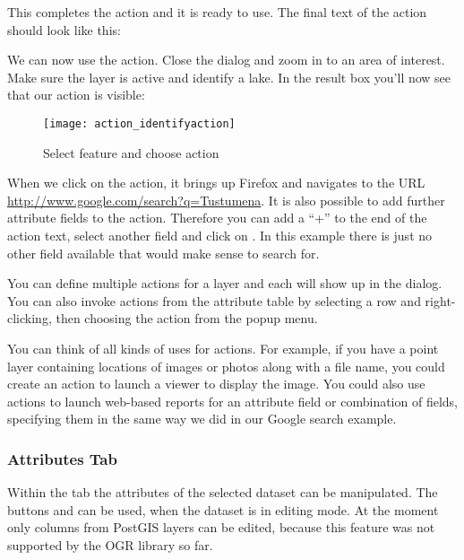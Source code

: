 This completes the action and it is ready to use. The final text of the action
should look like this:

\begin{center}
\end{center}

We can now use the action. Close the  dialog and zoom in to an area
of interest. Make sure the  layer is active and identify a
lake. In the result box you'll now see that our action is visible:

\begin{figure}[H]
   \begin{center}
   \caption{Select feature and choose action \nixcaption}\label{fig:identify_action}\smallskip
   \texttt{[image: action\_identifyaction]} 
\end{center}  
\end{figure}

When we click on the action, it brings up Firefox and navigates to the URL
\url{http://www.google.com/search?q=Tustumena}. It is also possible to add further 
attribute fields to the action. Therefore you can add a ``+'' to the end of the action 
text, select another field and click on . In this example there 
is just no other field available that would make sense to search for.

You can define multiple actions for a layer and each will show up in the
 dialog. You can also invoke actions from the attribute table
by selecting a row and right-clicking, then choosing the action from the popup
menu.

You can think of all kinds of uses for actions. For example, if you have a point layer
containing locations of images or photos along with a file name, you could
create an action to launch a viewer to display the image. You could also use
actions to launch web-based reports for an attribute field or combination of
fields, specifying them in the same way we did in our Google search example.

\subsubsection{Attributes Tab}\label{label_attributes}
Within the  tab the attributes of the selected dataset can be
manipulated. The buttons  and  can be
used, when the dataset is in editing mode. At the moment only columns from 
PostGIS layers can be edited, because this feature was not supported by 
the OGR library so far. 


